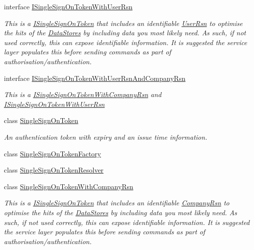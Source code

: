 \begin{DoxyCompactItemize}
interface \hyperlink{interfaceCqrs_1_1Authentication_1_1ISingleSignOnTokenWithUserRsn}{I\+Single\+Sign\+On\+Token\+With\+User\+Rsn}
\begin{DoxyCompactList}\small\item\em This is a \hyperlink{interfaceCqrs_1_1Authentication_1_1ISingleSignOnToken}{I\+Single\+Sign\+On\+Token} that includes an identifiable \hyperlink{interfaceCqrs_1_1Authentication_1_1ISingleSignOnTokenWithUserRsn_a3ba8dbde50e032ebc76c96a5ff40f47f_a3ba8dbde50e032ebc76c96a5ff40f47f}{User\+Rsn} to optimise the hits of the \hyperlink{}{Data\+Stores} by including data you most likely need. As such, if not used correctly, this can expose identifiable information. It is suggested the service layer populates this before sending commands as part of authorisation/authentication. \end{DoxyCompactList}\item 
interface \hyperlink{interfaceCqrs_1_1Authentication_1_1ISingleSignOnTokenWithUserRsnAndCompanyRsn}{I\+Single\+Sign\+On\+Token\+With\+User\+Rsn\+And\+Company\+Rsn}
\begin{DoxyCompactList}\small\item\em This is a \hyperlink{interfaceCqrs_1_1Authentication_1_1ISingleSignOnTokenWithCompanyRsn}{I\+Single\+Sign\+On\+Token\+With\+Company\+Rsn} and \hyperlink{interfaceCqrs_1_1Authentication_1_1ISingleSignOnTokenWithUserRsn}{I\+Single\+Sign\+On\+Token\+With\+User\+Rsn} \end{DoxyCompactList}\item 
class \hyperlink{classCqrs_1_1Authentication_1_1SingleSignOnToken}{Single\+Sign\+On\+Token}
\begin{DoxyCompactList}\small\item\em An authentication token with expiry and an issue time information. \end{DoxyCompactList}\item 
class \hyperlink{classCqrs_1_1Authentication_1_1SingleSignOnTokenFactory}{Single\+Sign\+On\+Token\+Factory}
\item 
class \hyperlink{classCqrs_1_1Authentication_1_1SingleSignOnTokenResolver}{Single\+Sign\+On\+Token\+Resolver}
\item 
class \hyperlink{classCqrs_1_1Authentication_1_1SingleSignOnTokenWithCompanyRsn}{Single\+Sign\+On\+Token\+With\+Company\+Rsn}
\begin{DoxyCompactList}\small\item\em This is a \hyperlink{interfaceCqrs_1_1Authentication_1_1ISingleSignOnToken}{I\+Single\+Sign\+On\+Token} that includes an identifiable \hyperlink{classCqrs_1_1Authentication_1_1SingleSignOnTokenWithCompanyRsn_abb327084c1ff87de84c92008b4437675_abb327084c1ff87de84c92008b4437675}{Company\+Rsn} to optimise the hits of the \hyperlink{}{Data\+Stores} by including data you most likely need. As such, if not used correctly, this can expose identifiable information. It is suggested the service layer populates this before sending commands as part of authorisation/authentication. \end{DoxyCompactList}\item 

\end{DoxyCompactItemize}
